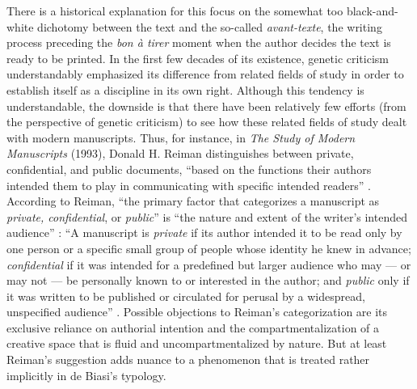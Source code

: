 \begin{paper}
\noindent There is a historical explanation for this focus on the somewhat too
black-and-white dichotomy between the text and the so-called
\emph{avant-texte}, the writing process preceding the \emph{bon à tirer}
moment when the author decides the text is ready to be printed. In the
first few decades of its existence, genetic criticism understandably
emphasized its difference from related fields of study in order to
establish itself as a discipline in its own right. Although this
tendency is understandable, the downside is that there have been
relatively few efforts (from the perspective of genetic criticism) to
see how these related fields of study dealt with modern manuscripts.
Thus, for instance, in \emph{The Study of Modern Manuscripts} (1993),
Donald H. Reiman distinguishes between private, confidential, and public
documents, ``based on the functions their authors intended them to play
in communicating with specific intended readers'' \citep[xi]{reiman_study_1993}.
According to Reiman, ``the primary factor that categorizes a manuscript
as \emph{private, confidential}, or \emph{public}'' is ``the nature and
extent of the writer's intended audience'' \citep[65; emphasis in original]{reiman_study_1993}: ``A
manuscript is \emph{private} if its author intended it to be read only
by one person or a specific small group of people whose identity he knew
in advance; \emph{confidential} if it was intended for a predefined but
larger audience who may --- or may not --- be personally known to or
interested in the author; and \emph{public} only if it was written to be
published or circulated for perusal by a widespread, unspecified
audience'' \citep[65; emphasis in original]{reiman_study_1993}. Possible objections to Reiman's
categorization are its exclusive reliance on authorial intention and the
compartmentalization of a creative space that is fluid and
uncompartmentalized by nature. But at least Reiman's suggestion adds
nuance to a phenomenon that is treated rather implicitly in de Biasi's
typology.


\end{paper}

